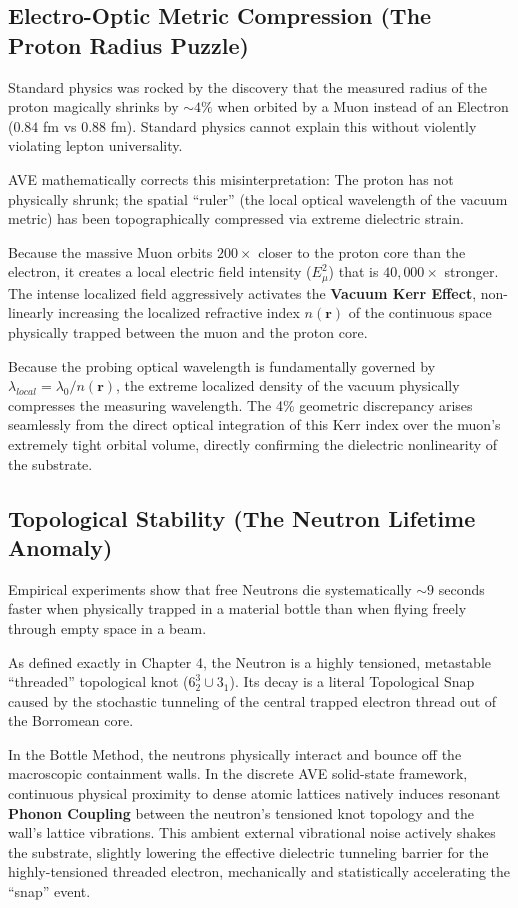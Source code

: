 \subsection{Electro-Optic Metric Compression (The Proton Radius Puzzle)}
Standard physics was rocked by the discovery that the measured radius of the proton magically shrinks by $\sim 4\%$ when orbited by a Muon instead of an Electron ($0.84$ fm vs $0.88$ fm). Standard physics cannot explain this without violently violating lepton universality.

AVE mathematically corrects this misinterpretation: The proton has not physically shrunk; the spatial ``ruler'' (the local optical wavelength of the vacuum metric) has been topographically compressed via extreme dielectric strain.

Because the massive Muon orbits $200\times$ closer to the proton core than the electron, it creates a local electric field intensity ($E_\mu^2$) that is $40,000\times$ stronger. The intense localized field aggressively activates the \textbf{Vacuum Kerr Effect}, non-linearly increasing the localized refractive index $n(\mathbf{r})$ of the continuous space physically trapped between the muon and the proton core. 

Because the probing optical wavelength is fundamentally governed by $\lambda_{local} = \lambda_0 / n(\mathbf{r})$, the extreme localized density of the vacuum physically compresses the measuring wavelength. The 4\% geometric discrepancy arises seamlessly from the direct optical integration of this Kerr index over the muon's extremely tight orbital volume, directly confirming the dielectric nonlinearity of the substrate.

\subsection{Topological Stability (The Neutron Lifetime Anomaly)}
Empirical experiments show that free Neutrons die systematically $\sim 9$ seconds faster when physically trapped in a material bottle than when flying freely through empty space in a beam. 

As defined exactly in Chapter 4, the Neutron is a highly tensioned, metastable ``threaded'' topological knot ($6^3_2 \cup 3_1$). Its decay is a literal Topological Snap caused by the stochastic tunneling of the central trapped electron thread out of the Borromean core. 

In the Bottle Method, the neutrons physically interact and bounce off the macroscopic containment walls. In the discrete AVE solid-state framework, continuous physical proximity to dense atomic lattices natively induces resonant \textbf{Phonon Coupling} between the neutron's tensioned knot topology and the wall's lattice vibrations. This ambient external vibrational noise actively shakes the substrate, slightly lowering the effective dielectric tunneling barrier for the highly-tensioned threaded electron, mechanically and statistically accelerating the ``snap'' event.


